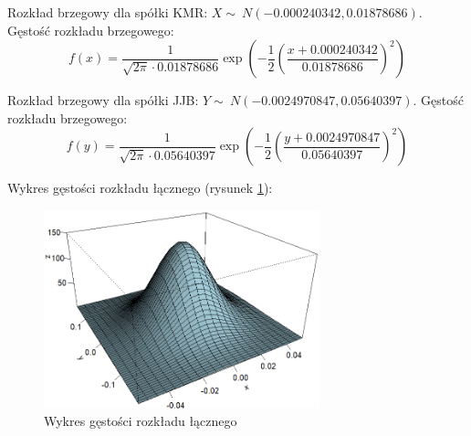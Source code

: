 \documentclass[a4paper,11pt]{article}
\begin{document}
Rozkład brzegowy dla spółki KMR: $ X \sim\ N(-0.000240342, 0.01878686)$.
Gęstość rozkładu brzegowego:
\begin{equation}
    f(x) = \frac{1}{\sqrt{2\pi}\cdot0.01878686} \exp\left(-\frac{1}{2}\left(\frac{x + 0.000240342}{0.01878686}\right)^2\right)
\end{equation}


Rozkład brzegowy dla spółki JJB: $ Y \sim\ N(-0.0024970847,0.05640397)$.
Gęstość rozkładu brzegowego:
\begin{equation}
    f(y) = \frac{1}{\sqrt{2\pi}\cdot0.05640397} \exp\left(-\frac{1}{2}\left(\frac{y + 0.0024970847}{0.05640397}\right)^2\right)
\end{equation}

Wykres gęstości rozkładu łącznego (rysunek \ref{fig:wykres_laczny}):

\begin{figure}[!htb]
	\centering
	\includegraphics[width=8cm]{images/wykres3d.png}
	\caption{Wykres gęstości rozkładu łącznego }
         \label{fig:wykres_laczny}
\end{figure}
\end{document}
